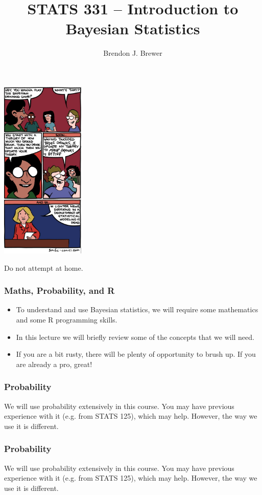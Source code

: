 \documentclass{beamer}
\author{Brendon J. Brewer}
\title{STATS 331 -- Introduction to Bayesian Statistics}
\institute{The University of Auckland}
\date{}
\begin{document}
\frame{\titlepage}

\begin{frame}
\begin{center}
\includegraphics[width=0.3\textwidth]{images/drinking_game.png}
\end{center}

Do not attempt at home.

\end{frame}

\begin{frame}
\frametitle{Maths, Probability, and R}

\begin{itemize}
\item To understand and use Bayesian statistics, we will
require some mathematics and some R programming
skills.\pause
\item  In this lecture we will briefly review some of the concepts
that we will need.\pause
\item If you are a bit rusty, there will be plenty of opportunity to
brush up. If you are already a pro, great!
\end{itemize}

\end{frame}


\begin{frame}
\frametitle{Probability}
We will use probability extensively in this course. You may have previous
experience with it (e.g. from STATS 125), which may help. However, the way we
use it is different.



\end{frame}


\begin{frame}
\frametitle{Probability}
We will use probability extensively in this course. You may have previous
experience with it (e.g. from STATS 125), which may help. However, the way we
use it is different.



\end{frame}
\end{document}
